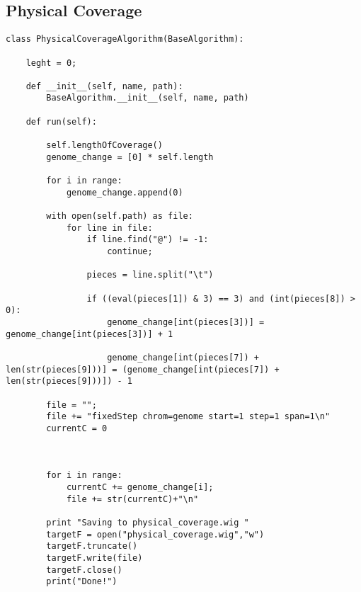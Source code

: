 \newpage
\subsection{Physical Coverage}
\tiny
\begin{verbatim}
class PhysicalCoverageAlgorithm(BaseAlgorithm):

    leght = 0;

    def __init__(self, name, path):
        BaseAlgorithm.__init__(self, name, path)

    def run(self):

        self.lengthOfCoverage()
        genome_change = [0] * self.length

        for i in range:
            genome_change.append(0)

        with open(self.path) as file:
            for line in file:
                if line.find("@") != -1:
                    continue;

                pieces = line.split("\t")

                if ((eval(pieces[1]) & 3) == 3) and (int(pieces[8]) > 0):
                    genome_change[int(pieces[3])] = genome_change[int(pieces[3])] + 1

                    genome_change[int(pieces[7]) + len(str(pieces[9]))] = (genome_change[int(pieces[7]) + len(str(pieces[9]))]) - 1

        file = "";
        file += "fixedStep chrom=genome start=1 step=1 span=1\n"
        currentC = 0



        for i in range:
            currentC += genome_change[i];
            file += str(currentC)+"\n"

        print "Saving to physical_coverage.wig "
        targetF = open("physical_coverage.wig","w")
        targetF.truncate()
        targetF.write(file)
        targetF.close()
        print("Done!")
\end{verbatim}


\newpage
